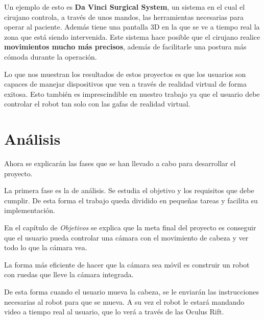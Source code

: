 \documentclass[twoside, 12pt]{epstfg}
\begin{document}
Un ejemplo de esto es \textbf{Da Vinci Surgical System}, un sistema en el cual el cirujano controla, a través de unos mandos, las herramientas necesarias para operar al paciente. Además tiene una pantalla 3D en la que se ve a tiempo real la zona que está siendo intervenida.
Este sistema hace posible que el cirujano realice \textbf{movimientos mucho más precisos}, además de facilitarle una postura más cómoda durante la operación. \cite{Hubens2003}

Lo que nos muestran los resultados de estos proyectos es que los usuarios son capaces de manejar dispositivos que ven a través de realidad virtual de forma exitosa. Esto también es imprescindible en nuestro trabajo ya que el usuario debe controlar el robot tan solo con las gafas de realidad virtual. 




\chapter{Análisis}
\label{chap:sistemadesarrollado}
Ahora se explicarán las fases que se han llevado a cabo para desarrollar el proyecto.

La primera fase es la de análisis. Se estudia el objetivo y los requisitos que debe cumplir. De esta forma el trabajo queda dividido en pequeñas tareas y facilita su implementación.

En el capítulo de \textit{Objetivos} se explica que la meta final del proyecto es conseguir que el usuario pueda controlar una cámara con el movimiento de cabeza y ver todo lo que la cámara vea.

La forma más eficiente de hacer que la cámara sea móvil es construir un robot con ruedas que lleve la cámara integrada. 

De esta forma cuando el usuario mueva la cabeza, se le enviarán las instrucciones necesarias al robot para que se mueva. A su vez el robot le estará mandando video a tiempo real al usuario, que lo verá a través de las Oculus Rift.
\end{document}
